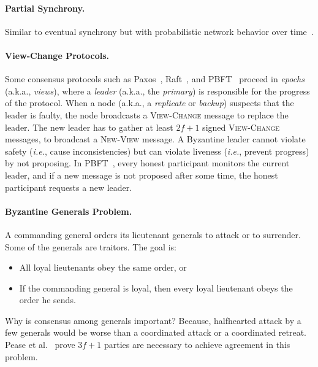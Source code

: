 \documentclass[11pt]{article}
\newcommand{\ie}{\textit{i.e.}}
\theoremstyle{mytheoremstyle}
\begin{document}
\paragraph{Partial Synchrony.} Similar to eventual synchrony but with probabilistic network behavior over time~\cite{dwork:1988:cpp}.

\paragraph{View-Change Protocols.} Some consensus protocols such as Paxos~\cite{lamport:1998:Paxos}, Raft~\cite{raft:2014}, and PBFT~\cite{pbft:99} proceed in \emph{epochs} (a.k.a., \emph{views}), where a \emph{leader} (a.k.a., the \emph{primary}) is responsible for the progress of the protocol. When a node (a.k.a., a \emph{replicate} or \emph{backup}) suspects that the leader is faulty, the node broadcasts a \textsc{View-Change} message to replace the leader. The new leader has to gather at least $2f+1$ signed \textsc{View-Change} messages, to broadcast a \textsc{New-View} message. A Byzantine leader cannot violate safety (\ie, cause inconsistencies) but can violate liveness (\ie, prevent progress) by not proposing. In PBFT~\cite{pbft:99}, every honest participant monitors the current leader, and if a new message is not proposed after some time, the honest participant requests a new leader.

\paragraph{Byzantine Generals Problem.} A commanding general orders its lieutenant generals to attack or to surrender. Some of the generals are traitors. The goal is:
\begin{itemize}
	\item All loyal lieutenants obey the same order, or
	\item If the commanding general is loyal, then every loyal lieutenant obeys the order he sends.
\end{itemize}

Why is consensus among generals important? Because, halfhearted attack by a few generals would be worse than a coordinated attack or a coordinated retreat. Pease et al.~\cite{pease80reaching} prove $3f+1$ parties are necessary to achieve agreement in this problem.


\end{document}
